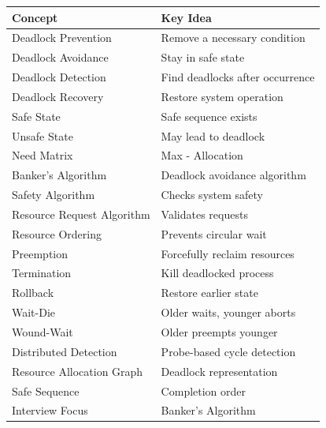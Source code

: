 \begin{longtable}{|p{5cm}|p{8cm}|}
\hline
Concept & Key Idea \\
\hline
Deadlock Prevention & Remove a necessary condition \\
\hline
Deadlock Avoidance & Stay in safe state \\
\hline
Deadlock Detection & Find deadlocks after occurrence \\
\hline
Deadlock Recovery & Restore system operation \\
\hline
Safe State & Safe sequence exists \\
\hline
Unsafe State & May lead to deadlock \\
\hline
Need Matrix & Max - Allocation \\
\hline
Banker's Algorithm & Deadlock avoidance algorithm \\
\hline
Safety Algorithm & Checks system safety \\
\hline
Resource Request Algorithm & Validates requests \\
\hline
Resource Ordering & Prevents circular wait \\
\hline
Preemption & Forcefully reclaim resources \\
\hline
Termination & Kill deadlocked process \\
\hline
Rollback & Restore earlier state \\
\hline
Wait-Die & Older waits, younger aborts \\
\hline
Wound-Wait & Older preempts younger \\
\hline
Distributed Detection & Probe-based cycle detection \\
\hline
Resource Allocation Graph & Deadlock representation \\
\hline
Safe Sequence & Completion order \\
\hline
Interview Focus & Banker's Algorithm \\
\hline
\end{longtable}